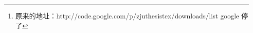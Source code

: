 \begin{abstract}
这份文档主要介绍了该\LaTeX{}论文模版的使用方法，注意事项，一些使用技巧。如有问题，可联系shuwei1204@163.com讨论。

另外，这份文档的源代码下载地址页面为：https://github.com/shuwei1204/ZJUthesis\footnote{原来的地址：http://code.google.com/p/zjuthesistex/downloads/list  google 停了}，我会不定期作一些更新，也可来邮件索取最新版本。

\end{abstract}
